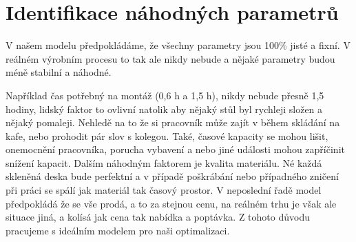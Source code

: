 \documentclass[../sablona-main.tex]{subfiles}
\begin{document}
\section{Identifikace náhodných parametrů}
V našem modelu předpokládáme, že všechny parametry jsou 100\% jisté a fixní. V reálném výrobním procesu to tak ale nikdy nebude a nějaké parametry budou méně stabilní a náhodné.

Například čas potřebný na montáž (0,6 h a 1,5 h), nikdy nebude přesně 1,5 hodiny, lidský faktor to ovlivní natolik aby nějaký stůl byl rychleji složen a nějaký pomaleji. Nehledě na to že si pracovník může zajít v během skládání na kafe, nebo prohodit pár slov s kolegou.
Také, časové kapacity se mohou lišit, onemocnění pracovníka, porucha vybavení a nebo jiné události mohou zapříčinit snížení kapacit.
Dalším náhodným faktorem je kvalita materiálu. Né každá skleněná deska bude perfektní a v případě poškrábání nebo případného zničení při práci se spálí jak materiál tak časový prostor.
V neposlední řadě model předpokládá že se vše prodá, a to za stejnou cenu, na reálném trhu je však ale situace jiná, a kolísá jak cena tak nabídka a poptávka.
Z tohoto důvodu pracujeme s ideálním modelem pro naši optimalizaci.
\end{document}
